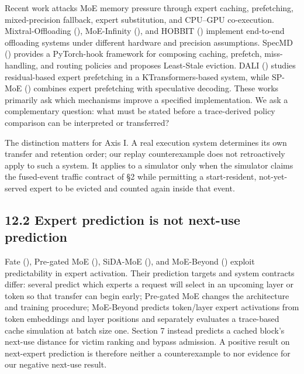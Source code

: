 \documentclass[
  10pt,
  letterpaper,
  10pt]{article}
\begin{document}
Recent work attacks MoE memory pressure through expert caching,
prefetching, mixed-precision fallback, expert substitution, and CPU--GPU
co-execution. Mixtral-Offloading
(),
MoE-Infinity (), and
HOBBIT () implement
end-to-end offloading systems under different hardware and precision
assumptions. SpecMD ()
provides a PyTorch-hook framework for composing caching, prefetch,
miss-handling, and routing policies and proposes Least-Stale eviction.
DALI () studies
residual-based expert prefetching in a KTransformers-based system, while
SP-MoE () combines expert
prefetching with speculative decoding. These works primarily ask which
mechanisms improve a specified implementation. We ask a complementary
question: what must be stated before a trace-derived policy comparison
can be interpreted or transferred?

The distinction matters for Axis I. A real execution system determines
its own transfer and retention order; our replay counterexample does not
retroactively apply to such a system. It applies to a simulator only
when the simulator claims the fused-event traffic contract of §2 while
permitting a start-resident, not-yet-served expert to be evicted and
counted again inside that event.

\subsection{12.2 Expert prediction is not next-use
prediction}\label{expert-prediction-is-not-next-use-prediction}

Fate (), Pre-gated MoE
(), SiDA-MoE
(), and MoE-Beyond
() exploit
predictability in expert activation. Their prediction targets and system
contracts differ: several predict which experts a request will select in
an upcoming layer or token so that transfer can begin early; Pre-gated
MoE changes the architecture and training procedure; MoE-Beyond predicts
token/layer expert activations from token embeddings and layer positions
and separately evaluates a trace-based cache simulation at batch size
one. Section 7 instead predicts a cached block's next-use distance for
victim ranking and bypass admission. A positive result on next-expert
prediction is therefore neither a counterexample to nor evidence for our
negative next-use result.
\end{document}

